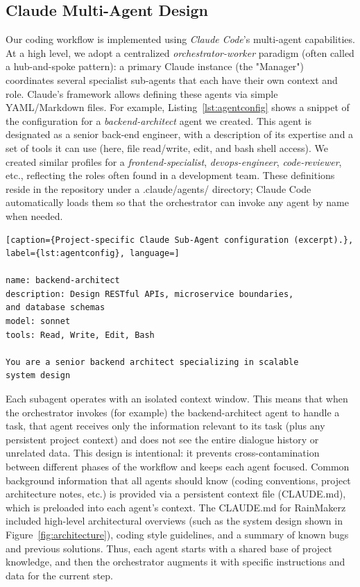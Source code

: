 \documentclass[11pt]{article}
\begin{document}
\subsection{Claude Multi-Agent Design}
Our coding workflow is implemented using \textit{Claude Code}'s multi-agent capabilities. At a high level, we adopt a centralized \emph{orchestrator-worker} paradigm (often called a hub-and-spoke pattern): a primary Claude instance (the "Manager") coordinates several specialist sub-agents that each have their own context and role. Claude's framework allows defining these agents via simple YAML/Markdown files. For example, Listing~\ref{lst:agentconfig} shows a snippet of the configuration for a \textit{backend-architect} agent we created. This agent is designated as a senior back-end engineer, with a description of its expertise and a set of tools it can use (here, file read/write, edit, and bash shell access). We created similar profiles for a \textit{frontend-specialist}, \textit{devops-engineer}, \textit{code-reviewer}, etc., reflecting the roles often found in a development team. These definitions reside in the repository under a .claude/agents/ directory; Claude Code automatically loads them so that the orchestrator can invoke any agent by name when needed.

\begin{lstlisting}[caption={Project-specific Claude Sub-Agent configuration (excerpt).}, label={lst:agentconfig}, language=]

name: backend-architect
description: Design RESTful APIs, microservice boundaries, 
and database schemas
model: sonnet
tools: Read, Write, Edit, Bash

You are a senior backend architect specializing in scalable 
system design
\end{lstlisting}

Each subagent operates with an isolated context window. This means that when the orchestrator invokes (for example) the backend-architect agent to handle a task, that agent receives only the information relevant to its task (plus any persistent project context) and does not see the entire dialogue history or unrelated data. This design is intentional: it prevents cross-contamination between different phases of the workflow and keeps each agent focused. Common background information that all agents should know (coding conventions, project architecture notes, etc.) is provided via a persistent context file (CLAUDE.md), which is preloaded into each agent's context. The CLAUDE.md for RainMakerz included high-level architectural overviews (such as the system design shown in Figure~\ref{fig:architecture}), coding style guidelines, and a summary of known bugs and previous solutions. Thus, each agent starts with a shared base of project knowledge, and then the orchestrator augments it with specific instructions and data for the current step.
\end{document}
